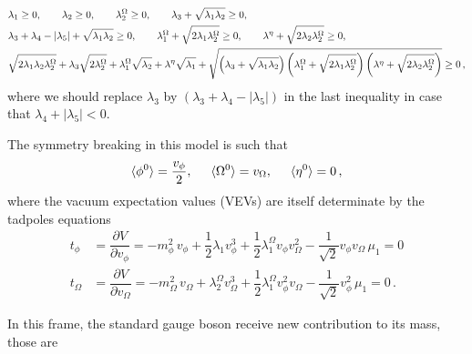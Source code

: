 \documentclass[12pt,letterpaper]{article}
\begin{document}
\begin{align}
\label{eq:co-positivity}
&\lambda_1 \geq 0,\hspace{0.7 cm}  
\lambda_2 \geq 0,\hspace{0.7 cm} 
\lambda_2^{\Omega} \geq 0, \hspace{0.7 cm} 
\lambda_3+\sqrt{\lambda_1\lambda_2}\geq 0,\nonumber \\
&\lambda_3+\lambda_4-|\lambda_5|+\sqrt{\lambda_1\lambda_2}\geq 0,\hspace{0.7 cm} 
\lambda_1^{\Omega}+\sqrt{2\lambda_1\lambda_2^{\Omega}}\geq 0,\hspace{0.7 cm} 
\lambda^{\eta}+\sqrt{2\lambda_2\lambda_2^{\Omega}}\geq 0,\nonumber\\
&\sqrt{2\lambda_1\lambda_2\lambda_2^{\Omega}}+\lambda_3\sqrt{2\lambda_2^{\Omega}}
+\lambda_1^{\Omega}\sqrt{\lambda_2}
+\lambda^{\eta}\sqrt{\lambda_1}
+\sqrt{\left(\lambda_3+\sqrt{\lambda_1\lambda_2}\right)
\left(\lambda_1^{\Omega}+\sqrt{2\lambda_1\lambda_2^{\Omega}}\right)
\left(\lambda^{\eta}+\sqrt{2\lambda_2\lambda_2^{\Omega}}\right)}\geq 0\,,
\end{align}
where we should replace $\lambda_3$ by $(\lambda_3+\lambda_4-|\lambda_5|)$ in the last inequality in case that $\lambda_4+|\lambda_5|<0$.

The symmetry breaking in this model is such that 
\begin{align}
\label{eq:VEVs}
\langle \phi^0\rangle = \dfrac{v_{\phi}}{2},\hspace{0.5 cm} \langle \Omega^0 \rangle = v_{\Omega},\hspace{0.5 cm} \langle \eta^0 \rangle=0\,,
\end{align}
where the vacuum expectation values (VEVs) are itself determinate by the tadpoles equations
\begin{align}
\label{eq:tadpole-phi}
t_{\phi}&=\dfrac{\partial V}{\partial v_{\phi}} = 
-m_{\phi}^2\,v_{\phi}+\dfrac{1}{2}\lambda_1v_{\phi}^3+ \dfrac{1}{2}\lambda_1^{\Omega}v_{\phi}v_{\Omega}^2-\dfrac{1}{\sqrt{2}}v_{\phi}v_{\Omega}\,\mu_1 =0  \\
\label{eq:tadpole-Omega}
t_{\Omega}&=\dfrac{\partial V}{\partial v_{\Omega}} = 
-m_{\Omega}^2\,v_{\Omega}+\lambda_2^{\Omega}v_{\Omega}^3+ \dfrac{1}{2}\lambda_1^{\Omega}v_{\phi}^2v_{\Omega}-\dfrac{1}{\sqrt{2}}v_{\phi}^2\,\mu_1 =0\,.
\end{align}

In this frame, the standard gauge boson receive new contribution to its mass, those are
\end{document}
